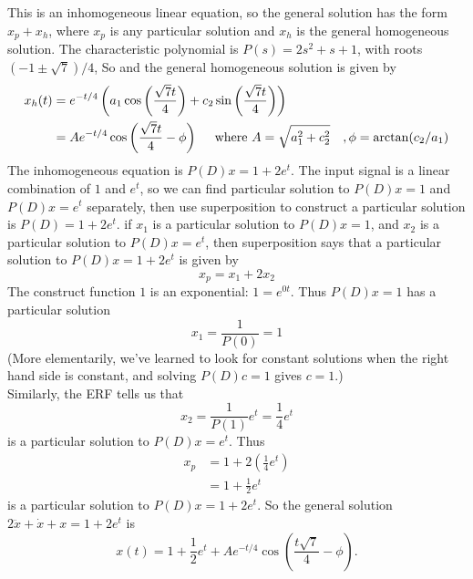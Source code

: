 This is an inhomogeneous linear equation, so the general solution has the form
$x_p + x_h$, where $x_p$ is any particular solution and $x_h$ is the
general homogeneous solution.
The characteristic polynomial is $P(s) = 2s^2 + s + 1$, with roots$(-1 \pm \sqrt{7})/4$,
So and the general homogeneous solution is given by
\begin{align*}
  \displaystyle x_h(t)
  \displaystyle &=e^{-t/4}\left(a_1\cos \left( \frac{\sqrt {7} t}{4}\right)
                  +c_2\sin \left( \frac{\sqrt {7}t}{4}\right)\right) \\
  \displaystyle &=Ae^{-t/4}\cos \left(\frac{\sqrt {7}t}{4}-\phi \right)
                  \quad \text{ where } A = \sqrt{a_1^2 + c_2^2}
                  \quad, \phi = \arctan(c_2 / a_1)                    
\end{align*}
The inhomogeneous equation is $P(D)x = 1 + 2e^{t}$.
The input signal is a linear combination of $1$ and $e^t$,
so we can find particular solution to $P(D)x =1$ and $P(D)x = e^t$ separately,
then use superposition to construct a particular solution is $P(D) = 1 + 2e^t$.
if $x_1$ is a particular solution to $P(D)x = 1$, and $x_2$ is a particular solution
to $P(D)x = e^t$, then superposition says that a particular solution to
$P(D)x = 1 + 2e^t$ is given by
\begin{equation*}
  x_p = x_1 + 2x_2
\end{equation*}
The construct function $1$ is an exponential: $1=e^{0t}$. Thus $P(D)x = 1$ has a particular solution
\begin{equation*}
  x_1 = \frac{1}{P(0)} = 1
\end{equation*}
(More elementarily, we've learned to look for constant solutions when the right hand side is constant, and solving $P(D)c = 1$ gives $c = 1$.)\\
Similarly, the ERF tells us that
\begin{equation*}
  x_2 = \frac{1}{P(1)} e^t = \frac{1}{4} e^t  
\end{equation*}
is a particular solution to $P(D)x = e^t$. Thus
\begin{align*}
  x_p &= 1 + 2 \left( \frac{1}{4} e^t\right) \\
      &= 1 + \frac{1}{2} e^t
\end{align*}
is a particular solution to $P(D)x = 1 + 2e^t$. So the general solution
$2\ddot{x}+\dot{x}+x=1+2e^{t}$ is
\begin{equation*}
  \displaystyle  x\left(t\right)=
  1+\frac{1}{2}e^ t+Ae^{-t/4}\cos \left(\frac{t\sqrt {7}}{4}-\phi \right).
\end{equation*}

